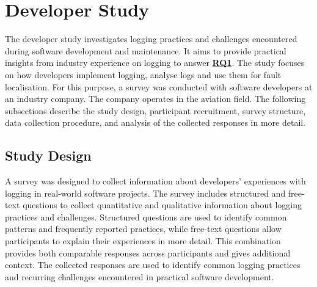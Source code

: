 \section{Developer Study} \label{sec:meth_developerstudy}
The developer study investigates logging practices and challenges encountered during software development and maintenance.
It aims to provide practical insights from industry experience on logging to answer \hyperref[table:t1rq]{\textbf{RQ1}}.
The study focuses on how developers implement logging, analyse logs and use them for fault localisation.
For this purpose, a survey was conducted with software developers at an industry company. The company operates in the aviation field.
The following subsections describe the study design, participant recruitment, survey structure,
data collection procedure, and analysis of the collected responses in more detail.

\subsection{Study Design}
A survey was designed to collect information about developers' experiences with logging in real-world software projects.
The survey includes structured and free-text questions to collect quantitative and qualitative information about logging practices and challenges.
Structured questions are used to identify common patterns and frequently reported practices,
while free-text questions allow participants to explain their experiences in more detail.
This combination provides both comparable responses across participants and gives additional context.
The collected responses are used to identify common logging practices and recurring challenges encountered in practical software development.

